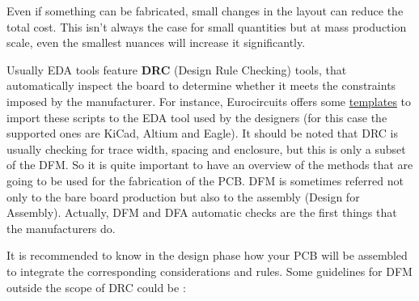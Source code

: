 \documentclass[final]{cubedoc}
\begin{document}
	Even if something can be fabricated, small changes in the layout can reduce the total cost. This isn't always the case for small quantities but at mass production scale, even the smallest nuances will increase it significantly. 
	
	Usually EDA tools feature \textbf{DRC} (Design Rule Checking) tools, that automatically inspect the board to determine whether it meets the constraints imposed by the manufacturer.
	For instance, Eurocircuits offers some \href{https://www.eurocircuits.com/drc-settings-and-guide-lines-for-cad-packages/}{templates} to import these scripts to the EDA tool used by the designers (for this case the supported ones are KiCad, Altium and Eagle). It should be noted that DRC is usually checking for trace width, spacing and enclosure, but this is only a subset of the DFM. So it is quite important to have an overview of the methods that are going to be used for the fabrication of the PCB. DFM is sometimes referred not only to the bare board production but also to the assembly (Design for Assembly). Actually, DFM and DFA automatic checks are the first things that the manufacturers do. 
	
	It is recommended to know in the design phase how your PCB will be assembled to integrate the corresponding considerations and rules. Some guidelines for DFM outside the scope of DRC could be \cite{mitzner2011complete, ema2019hitchhiker}:
	
\end{document}
